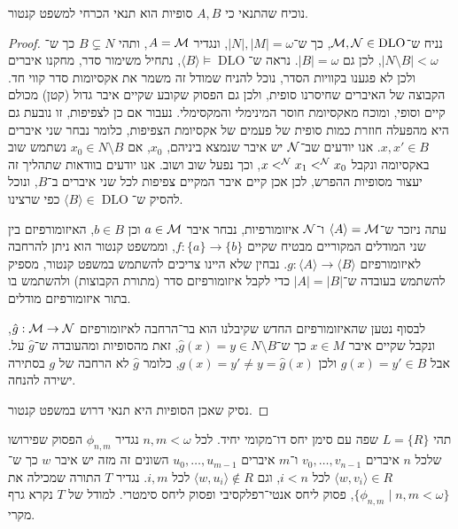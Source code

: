 \subquestion{}
נוכיח שהתנאי כי $A, B$ סופיות הוא תנאי הכרחי למשפט קנטור.
\begin{proof}
	נניח ש־$\mathcal{M}, \mathcal{N} \in \operatorname{DLO}$, כך ש־$|N|, |M| = \omega$, ונגדיר $A = \mathcal{M}$, ותהי $B \subsetneq N$ כך ש־$|N \setminus B| < \omega$, לכן גם $|B| = \omega$.
	נראה ש־$\langle B \rangle \models \operatorname{DLO}$, נתחיל משימור סדר, מחקנו איברים ולכן לא פגענו בקוויות הסדר, נוכל להניח שמודל זה משמר את אקסיומות סדר קווי חד.
	הקבוצה של האיברים שחיסרנו סופית, ולכן גם הפסוק שקובע שקיים איבר גדול (קטן) מכולם קיים וסופי, ומוכח מאקסיומת חוסר המינימלי והמקסימלי.
	נעבור אם כן לצפיפות, זו נובעת גם היא מהפעלה חוזרת כמות סופית של פעמים של אקסיומת הצפיפות, כלומר נבחר שני איברים $x, x' \in B$.
	אנו יודעים שב־$\mathcal{N}$ יש איבר שנמצא ביניהם, $x_0$, אם $x_0 \in N \setminus B$ נשתמש שוב באקסיומה ונקבל $x <^{\mathcal{N}} x_1 <^{\mathcal{N}} x_0$, וכך נפעל שוב ושוב.
	אנו יודעים בוודאות שתהליך זה יעצור מסופיות ההפרש, לכן אכן קיים איבר המקיים צפיפות לכל שני איברים ב־$B$, ונוכל להסיק ש־$\langle B \rangle \in \operatorname{DLO}$ כפי שרצינו.

	עתה ניזכר ש־$\langle A \rangle = \mathcal{M}$ ו־$\mathcal{N}$ איזומורפיות, נבחר איבר $a \in \mathcal{M}$ וכן $b \in B$, האיזומורפיזם בין שני המודלים המקוריים מבטיח שקיים $f : \{ a \} \to \{ b \}$,
	וממשפט קנטור הוא ניתן להרחבה לאיזומורפיזם $g : \langle A \rangle \to \langle B \rangle$.
	נבחין שלא היינו צריכים להשתמש במשפט קנטור, מספיק להשתמש בעובדה ש־$|A| = |B|$ כדי לקבל איזומורפיזם סדר (מתורת הקבוצות) ולהשתמש בו בתור איזומורפיזם מודלים.

	לבסוף נטען שהאיזומורפיזם החדש שקיבלנו הוא בר־הרחבה לאיזומורפיזם $\hat{g} : \mathcal{M} \to \mathcal{N}$, ונקבל שקיים איבר $x \in M$ כך ש־$\hat{g}(x) = y \in N \setminus B$,
	זאת מהסופיות ומהעובדה ש־$\hat{g}$ על.
	אבל $g(x) = y' \in B$ ולכן $g(x) = y' \ne y = \hat{g}(x)$, כלומר $\hat{g}$ לא הרחבה של $g$ בסתירה ישירה להנחה.

	נסיק שאכן הסופיות היא תנאי דרוש במשפט קנטור.
\end{proof}

\question{}
תהי $L = \{ R \}$ שפה עם סימן יחס דו־מקומי יחיד.
לכל $n, m < \omega$ נגדיר $\phi_{n, m}$ הפסוק שפירושו שלכל $n$ איברים $v_0, \dots, v_{n - 1}$ ו־$m$ איברים $u_0, \dots, u_{m - 1}$ השונים זה מזה יש איבר $w$ כך ש־$\langle w, v_i \rangle \in R$ לכל $i < n$,
וגם $\langle w, u_i \rangle \notin R$ לכל $i , m$.
נגדיר $T$ התורה שמכילה את $\{ \phi_{n, m} \mid n, m < \omega \}$, פסוק ליחס אנטי־רפלקסיבי ופסוק ליחס סימטרי.
למודל של $T$ נקרא גרף מקרי.

